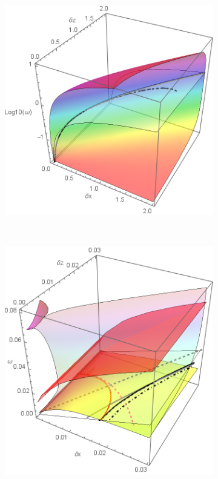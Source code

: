 \documentclass[a4paper,11pt]{article}
\begin{document}
\begin{figure}[!h]
	\begin{subfigure}{0.45\linewidth}
		\includegraphics[width=1\linewidth]
		{FIGURES/Fig_App4_Imag.png}
		\caption{}
	\end{subfigure}
	~
	\begin{subfigure}{0.45\linewidth}
		\includegraphics[width=1\linewidth]
		{FIGURES/Fig_App8_zoom.png}
		\caption{}
	\end{subfigure}
	

\end{figure}
\end{document}
